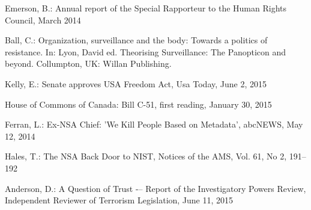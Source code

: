 \documentclass{llncs}
\begin{document}
%
%
\begin{thebibliography}{}
%
Emerson, B.:
Annual report of the Special Rapporteur to the Human Rights Council, March 2014

Ball, C.:
Organization, surveillance and the body: Towards a politics of resistance. In: Lyon, David ed. Theorising Surveillance: The Panopticon and beyond. Collumpton, UK: Willan Publishing. 

Kelly, E.:
Senate approves USA Freedom Act, Usa Today,  June 2, 2015

House of Commons of Canada:
Bill C-51, first reading, January 30, 2015

Ferran, L.:
Ex-NSA Chief: 'We Kill People Based on Metadata', abcNEWS, May 12, 2014

Hales, T.:
The NSA Back Door to NIST, Notices of the AMS, Vol. 61, No 2, 191--192

Anderson, D.:
A Question of Trust -– Report of the Investigatory Powers Review, Independent Reviewer of Terrorism Legislation, June 11, 2015

\end{thebibliography}
\end{document}
